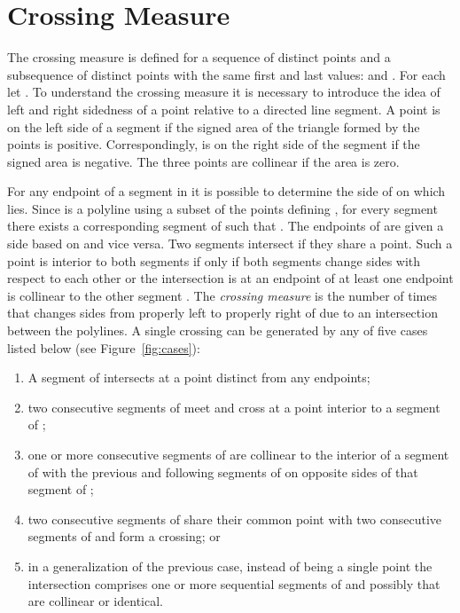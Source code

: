 \documentclass{article}
\begin{document}
\section{Crossing Measure}
\label{sect:measure}

The crossing measure  is defined for a sequence of  distinct
points  and a subsequence of  distinct points  with the same first and last values:
 and .  For each  let .  To understand the crossing measure it is necessary to
introduce the idea of left and right sidedness of a point relative to a
directed line segment.  A point  is on the left side of a segment
 if the signed area of the triangle formed by the
points  is positive.  Correspondingly, 
is on the right side of the segment if the signed area is negative.  The
three points are collinear if the area is zero.

For any endpoint  of a segment in  it is possible to determine the side
of  on which  lies. Since  is a polyline using a
subset of the points defining , for every segment  there
exists a corresponding segment of  such that .  The endpoints of  are given a side
based on  and vice versa.  Two segments intersect if they share a
point.  Such a point is interior to both segments if only if both segments
change sides with respect to each other or the intersection is at an
endpoint of at least one endpoint is collinear to the other segment \cite[p. 
566]{skiena:2008uq}.  The \emph{crossing measure}  is the number
of times that  changes sides from properly left
to properly right of  due to an intersection between the polylines.  A
single crossing can be generated by any of five cases listed below (see Figure~\ref{fig:cases}):

\begin{enumerate}
  \item{A segment of  intersects  at a point distinct from any
    endpoints;}
  \item{two consecutive segments of  meet and cross at a point interior
    to a segment of ;}
  \item{one or more consecutive segments of  are collinear to the interior of a segment of  with the previous and following segments of  on opposite sides of that segment of ;}
\item{two consecutive segments of  share their common point with two consecutive segments of  and form a crossing; or }
  \item{in a generalization of the previous case, instead of being a
    single point the intersection comprises one or more sequential segments
    of  and possibly  that are collinear or identical.}
\end{enumerate}
\end{document}
